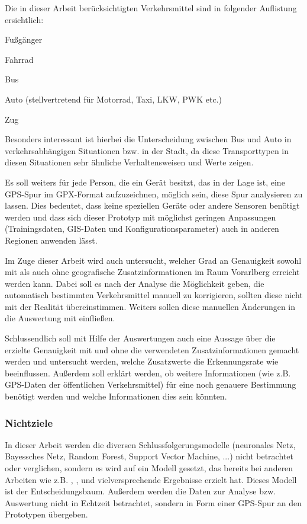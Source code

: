 Die in dieser Arbeit berücksichtigten Verkehrsmittel sind in folgender Auflistung ersichtlich:

\begin{pitemize}
\item Fußgänger
\item Fahrrad
\item Bus
\item Auto (stellvertretend für Motorrad, Taxi, LKW, PWK etc.)
\item Zug
\end{pitemize}

Besonders interessant ist hierbei die Unterscheidung zwischen Bus und Auto in verkehrsabhängigen Situationen bzw. in der Stadt, da diese Transporttypen in diesen Situationen sehr ähnliche Verhaltensweisen und Werte zeigen. 

Es soll weiters für jede Person, die ein Gerät besitzt, das in der Lage ist, eine GPS-Spur im GPX-Format aufzuzeichnen, möglich sein, diese Spur analysieren zu lassen. Dies bedeutet, dass keine speziellen Geräte oder andere Sensoren benötigt werden und dass sich dieser Prototyp mit möglichst geringen Anpassungen (Trainingsdaten, GIS-Daten und Konfigurationsparameter) auch in anderen Regionen anwenden lässt.

Im Zuge dieser Arbeit wird auch untersucht, welcher Grad an Genauigkeit sowohl mit als auch ohne geografische Zusatzinformationen im Raum Vorarlberg erreicht werden kann. Dabei soll es nach der Analyse die Möglichkeit geben, die automatisch bestimmten Verkehrsmittel manuell zu korrigieren, sollten diese nicht mit der Realität übereinstimmen. Weiters sollen diese manuellen Änderungen in die Auswertung mit einfließen. 

Schlussendlich soll mit Hilfe der Auswertungen auch eine Aussage über die erzielte Genauigkeit mit und ohne die verwendeten Zusatzinformationen gemacht werden und untersucht werden, welche Zusatzwerte die Erkennungsrate wie beeinflussen. Außerdem soll erklärt werden, ob weitere Informationen (wie z.B. GPS-Daten der öffentlichen Verkehrsmittel) für eine noch genauere Bestimmung benötigt werden und welche Informationen dies sein könnten. 

\subsubsection{Nichtziele}

In dieser Arbeit werden die diversen Schlussfolgerungsmodelle (neuronales Netz, Bayessches Netz, Random Forest, Support Vector Machine, ...) nicht betrachtet oder verglichen, sondern es wird auf ein Modell gesetzt, das bereits bei anderen Arbeiten wie z.B. \cite{stenneth_transportation_2011}, \cite{reddy_using_2010}, \cite{sebastian_nagel_moglichkeitsstudie_2011} und  \cite{zheng_learning_2008} vielversprechende Ergebnisse erzielt hat. Dieses Modell ist der Entscheidungsbaum. Außerdem werden die Daten zur Analyse bzw. Auswertung nicht in Echtzeit betrachtet, sondern in Form einer GPS-Spur an den Prototypen übergeben.

